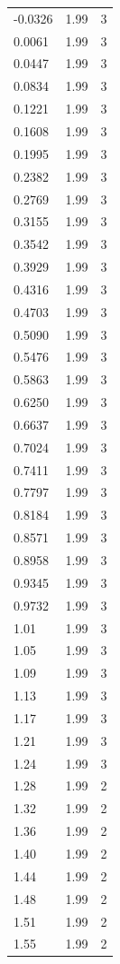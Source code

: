 \begin{longtable}{lrr}
  -0.0326 & 1.99 & 3 \\
  0.0061 & 1.99 & 3 \\
  0.0447 & 1.99 & 3 \\
  0.0834 & 1.99 & 3 \\
  0.1221 & 1.99 & 3 \\
  0.1608 & 1.99 & 3 \\
  0.1995 & 1.99 & 3 \\
  0.2382 & 1.99 & 3 \\
  0.2769 & 1.99 & 3 \\
  0.3155 & 1.99 & 3 \\
  0.3542 & 1.99 & 3 \\
  0.3929 & 1.99 & 3 \\
  0.4316 & 1.99 & 3 \\
  0.4703 & 1.99 & 3 \\
  0.5090 & 1.99 & 3 \\
  0.5476 & 1.99 & 3 \\
  0.5863 & 1.99 & 3 \\
  0.6250 & 1.99 & 3 \\
  0.6637 & 1.99 & 3 \\
  0.7024 & 1.99 & 3 \\
  0.7411 & 1.99 & 3 \\
  0.7797 & 1.99 & 3 \\
  0.8184 & 1.99 & 3 \\
  0.8571 & 1.99 & 3 \\
  0.8958 & 1.99 & 3 \\
  0.9345 & 1.99 & 3 \\
  0.9732 & 1.99 & 3 \\
  1.01 & 1.99 & 3 \\
  1.05 & 1.99 & 3 \\
  1.09 & 1.99 & 3 \\
  1.13 & 1.99 & 3 \\
  1.17 & 1.99 & 3 \\
  1.21 & 1.99 & 3 \\
  1.24 & 1.99 & 3 \\
  1.28 & 1.99 & 2 \\
  1.32 & 1.99 & 2 \\
  1.36 & 1.99 & 2 \\
  1.40 & 1.99 & 2 \\
  1.44 & 1.99 & 2 \\
  1.48 & 1.99 & 2 \\
  1.51 & 1.99 & 2 \\
  1.55 & 1.99 & 2 \\

\end{longtable}
